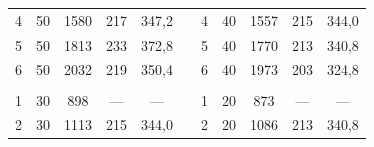 \documentclass[11pt,a4paper,oneside]{article}
\begin{document}
\begin{enumerate}
\begin{center}
\begin{table}[h!]
\begin{tabular}{cccclcccccl}
\multicolumn{1}{|c|}{4}          & \multicolumn{1}{c|}{50}            & \multicolumn{1}{c|}{1580}           & \multicolumn{1}{c|}{217}                    & \multicolumn{1}{l|}{347,2}           & \multicolumn{1}{c|}{} & \multicolumn{1}{c|}{4}          & \multicolumn{1}{c|}{40}            & \multicolumn{1}{c|}{1557}           & \multicolumn{1}{c|}{215}                    & \multicolumn{1}{l|}{344,0}           \\ \cline{1-5} \cline{7-11} 
\multicolumn{1}{|c|}{5}          & \multicolumn{1}{c|}{50}            & \multicolumn{1}{c|}{1813}           & \multicolumn{1}{c|}{233}                    & \multicolumn{1}{l|}{372,8}           & \multicolumn{1}{c|}{} & \multicolumn{1}{c|}{5}          & \multicolumn{1}{c|}{40}            & \multicolumn{1}{c|}{1770}           & \multicolumn{1}{c|}{213}                    & \multicolumn{1}{l|}{340,8}           \\ \cline{1-5} \cline{7-11} 
\multicolumn{1}{|c|}{6}          & \multicolumn{1}{c|}{50}            & \multicolumn{1}{c|}{2032}           & \multicolumn{1}{c|}{219}                    & \multicolumn{1}{l|}{350,4}           & \multicolumn{1}{c|}{} & \multicolumn{1}{c|}{6}          & \multicolumn{1}{c|}{40}            & \multicolumn{1}{c|}{1973}           & \multicolumn{1}{c|}{203}                    & \multicolumn{1}{l|}{324,8}           \\ \cline{1-5} \cline{7-11} 
\multicolumn{1}{|c}{}            &                                    &                                     &                                             & \multicolumn{1}{c}{}                 &                       &                                 &                                    &                                     &                                             & \multicolumn{1}{c|}{}                \\ \cline{1-5} \cline{7-11} 
\multicolumn{1}{|c|}{1}          & \multicolumn{1}{c|}{30}            & \multicolumn{1}{c|}{898}            & \multicolumn{1}{c|}{---}                    & \multicolumn{1}{c|}{---}             & \multicolumn{1}{c|}{} & \multicolumn{1}{c|}{1}          & \multicolumn{1}{c|}{20}            & \multicolumn{1}{c|}{873}            & \multicolumn{1}{c|}{---}                    & \multicolumn{1}{c|}{---}             \\ \cline{1-5} \cline{7-11} 
\multicolumn{1}{|c|}{2}          & \multicolumn{1}{c|}{30}            & \multicolumn{1}{c|}{1113}           & \multicolumn{1}{c|}{215}                    & \multicolumn{1}{l|}{344,0}           & \multicolumn{1}{c|}{} & \multicolumn{1}{c|}{2}          & \multicolumn{1}{c|}{20}            & \multicolumn{1}{c|}{1086}           & \multicolumn{1}{c|}{213}                    & \multicolumn{1}{l|}{340,8}           \\ \cline{1-5} \cline{7-11} 

\end{tabular}
\end{table}
\end{center}
\end{enumerate}
\end{document}
